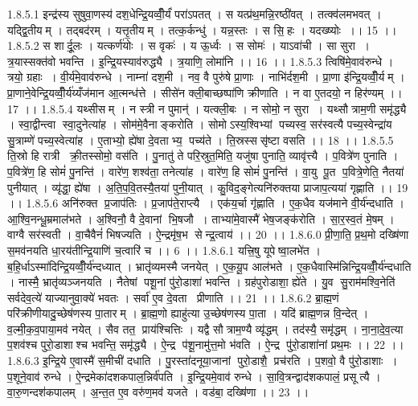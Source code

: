 1.8.5.1
इन्द्र॑स्य सुषुवा॒णस्य॑ दश॒धेन्द्रि॒यव्वीँ॒र्यं॑ परा॑ऽपतत् । स यत्प्र॑थ॒मन्नि॒रष्ठी॑वत् । तत्क्व॑लमभवत् । यद्द्वि॒तीयम् । तद्बद॑रम् । यत्तृ॒तीयम् । तत्क॒र्कन्धु॑ । यन्न॒स्तः । स सि॒॒हः । यदख्ष्योः ।। 15 ।।
1.8.5.2
स शार्दू॒लः । यत्कर्ण॑योः । स वृकः॑ । य ऊ॒र्ध्वः । स सोमः॑ । याऽवा॑ची । सा सुरा । त्र॒यास्सक्त॑वो भवन्ति । इ॒न्द्रि॒यस्याव॑रुद्ध्यै । त्र॒याणि॒ लोमा॑नि ।। 16 ।।
1.8.5.3
त्विषि॑मे॒वाव॑रुन्धे । त्रयो॒ ग्रहाः । वी॒र्य॑मे॒वाव॑रुन्धे । नाम्ना॑ दश॒मी । नव॒ वै पुरु॑षे प्रा॒णाः । नाभि॑र्दश॒मी । प्रा॒णा इ॑न्द्रि॒यव्वीँ॒र्यम् । प्रा॒णाने॒वेन्द्रि॒यव्वीँ॒र्य॑य्यँज॑मान आ॒त्मन्ध॑त्ते । सीसे॑न क्ली॒बाच्छष्पा॑णि क्रीणाति । न वा ए॒तदयो॒ न हिर॑ण्यम् ।। 17 ।।
1.8.5.4
यथ्सीसम् । न स्त्री न पुमान्॑ । यत्क्ली॒बः । न सोमो॒ न सुरा । यथ्सौत्राम॒णी समृ॑द्ध्यै । स्वा॒द्वीन्त्वा स्वा॒दुनेत्या॑ह । सोम॑मे॒वैनाङ्करोति । सोमोऽस्य॒श्विभ्यां पच्यस्व॒ सर॑स्वत्यै पच्य॒स्वेन्द्रा॑य सु॒त्राम्णे॑ पच्य॒स्वेत्या॑ह । ए॒ताभ्यो॒ ह्ये॑षा दे॒वताभ्य॒ पच्य॑ते । ति॒स्रस्ससृ॑ष्टा वसति ।। 18 ।।
1.8.5.5
ति॒स्रो हि रात्री क्री॒तस्सोमो॒ वस॑ति । पु॒नातु॑ ते परि॒स्रुत॒मिति॒ यजु॑षा पुनाति॒ व्यावृ॑त्त्यै । प॒वित्रे॑ण पुनाति । प॒वित्रे॑ण॒ हि सोमं॑ पु॒नन्ति॑ । वारे॑ण॒ शश्व॑ता॒ तनेत्या॑ह । वारे॑ण॒ हि सोमं॑ पु॒नन्ति॑ । वा॒यु पू॒त प॒वित्रे॒णेति॒ नैतया॑ पुनीयात् । व्यृ॑द्धा॒ ह्ये॑षा । अ॒ति॒प॒वि॒तस्यै॒तया॑ पुनी॒यात् । कु॒विद॒ङ्गेत्यनि॑रुक्तया प्राजाप॒त्यया॑ गृह्णाति ।। 19 ।।
1.8.5.6
अनि॑रुक्त प्र॒जाप॑तिः । प्र॒जाप॑ते॒राप्त्यै । एक॑य॒र्चा गृ॑ह्णाति । ए॒क॒धैव यज॑माने वी॒र्य॑न्दधाति । आ॒श्वि॒नन्धू॒म्रमाल॑भते । अ॒श्विनौ॒ वै दे॒वानां भि॒षजौ । ताभ्या॑मे॒वास्मै॑ भेष॒जङ्क॑रोति । सा॒र॒स्व॒तं मे॒षम् । वाग्वै सर॑स्वती । वा॒चैवैनं॑ भिषज्यति । ऐ॒न्द्रमृ॑ष॒भ सेन्द्र॒त्वाय॑ ।। 20 ।।
1.8.6.0
प्री॒णा॒ति॒ प्र॒थ॒मो दख्षि॑णा स॒मव॑नयति धा॒रय॑तीन्द्रि॒याणि॑ च॒त्वारि॑ च ।। 6 ।।
1.8.6.1
यत्त्रि॒षु यूपेष्वा॒लभे॑त । ब॒हि॒र्धाऽस्मा॑दिन्द्रि॒यव्वीँ॒र्य॑न्दध्यात् । भ्रातृ॑व्यमस्मै जनयेत् । ए॒क॒यू॒प आल॑भते । ए॒क॒धैवास्मि॑न्निन्द्रि॒यव्वीँ॒र्य॑न्दधाति । नास्मै॒ भ्रातृ॑व्यञ्जनयति । नैतेषां पशू॒नां पु॑रो॒डाशा॑ भवन्ति । ग्रह॑पुरोडाशा॒ ह्ये॑ते । यु॒व सु॒राम॑मश्वि॒नेति॑ सर्वदेव॒त्ये॑ याज्यानुवा॒क्ये॑ भवतः । सर्वा॑ ए॒व दे॒वता प्रीणाति ।। 21 ।।
1.8.6.2
ब्रा॒ह्म॒णं परि॑क्रीणीयादु॒च्छेष॑णस्य पा॒तारम् । ब्रा॒ह्म॒णो ह्याहु॑त्या उ॒च्छेष॑णस्य पा॒ता । यदि॑ ब्राह्म॒णन्न वि॒न्देत् । व॒ल्मी॒क॒व॒पाया॒मव॑ नयेत् । सैव तत॒ प्राय॑श्चित्तिः । यद्वै सौत्राम॒ण्यै व्यृ॑द्धम् । तद॑स्यै॒ समृ॑द्धम् । ना॒ना॒दे॒व॒त्या प॒शव॑श्च पुरो॒डाशाश्च भवन्ति॒ समृ॑द्ध्यै । ऐ॒न्द्र प॑शू॒नामु॑त्त॒मो भ॑वति । ऐ॒न्द्र पु॑रो॒डाशा॑नां प्रथ॒मः ।। 22 ।।
1.8.6.3
इ॒न्द्रि॒ये ए॒वास्मै॑ स॒मीची॑ दधाति । पु॒रस्ता॑दनूया॒जानां पुरो॒डाशै॒ प्रच॑रति । प॒शवो॒ वै पु॑रो॒डाशाः । प॒शूने॒वाव॑ रुन्धे । ऐ॒न्द्रमेका॑दशकपाल॒न्निर्व॑पति । इ॒न्द्रि॒यमे॒वाव॑ रुन्धे । सा॒वि॒त्रन्द्वाद॑शकपालं॒ प्रसूत्यै । वा॒रु॒णन्दश॑कपालम् । अ॒न्त॒त ए॒व वरु॑ण॒मव॑ यजते । वड॑बा॒ दख्षि॑णा ।। 23 ।।
